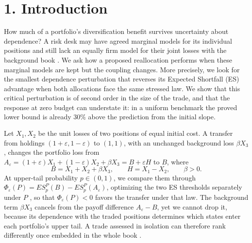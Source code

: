 \section{1. Introduction}\label{sec:introduction}

How much of a portfolio's diversification benefit survives uncertainty about dependence? A risk desk may have agreed marginal models for its individual positions and still lack an equally firm model for their joint losses with the background book \cite{pflugpohl2018}. We ask how a proposed reallocation performs when these marginal models are kept but the coupling changes. More precisely, we look for the smallest dependence perturbation that reverses its Expected Shortfall (ES) advantage when both allocations face the same stressed law. We show that this critical perturbation is of second order in the size of the trade, and that the response at zero budget can understate it: in a uniform benchmark the proved lower bound is already \(30\%\) above the prediction from the initial slope.

Let \(X_1,X_2\) be the unit losses of two positions of equal initial cost. A transfer from holdings \((1+\varepsilon,1-\varepsilon)\) to \((1,1)\), with an unchanged background loss \(\beta X_3\), changes the portfolio loss from \(A_\varepsilon=(1+\varepsilon)X_1+(1-\varepsilon)X_2+\beta X_3=B+\varepsilon H\) to \(B\), where
\[
B=X_1+X_2+\beta X_3,\qquad H=X_1-X_2,\qquad \beta>0.
\]
At upper-tail probability \(p\in(0,1)\), we compare them through \(\Phi_\varepsilon(P)=ES_p^P(B)-ES_p^P(A_\varepsilon)\), optimizing the two ES thresholds separately under \(P\) \cite{rockafellar2002}, so that \(\Phi_\varepsilon(P)<0\) favors the transfer under that law. The background term \(\beta X_3\) cancels from the payoff difference \(A_\varepsilon-B\), yet we cannot drop it, because its dependence with the traded positions determines which states enter each portfolio's upper tail. A trade assessed in isolation can therefore rank differently once embedded in the whole book \cite{brandtner2018}.

